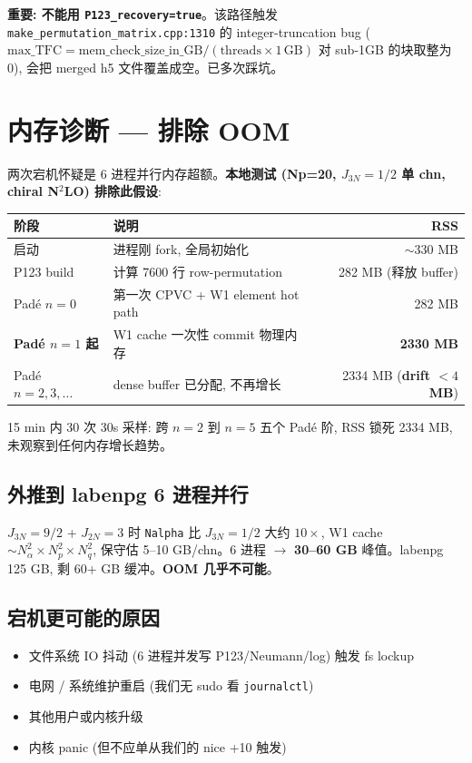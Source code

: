 \documentclass[11pt,a4paper]{article}
\begin{document}
\textbf{重要: 不能用 \texttt{P123\_recovery=true}}。该路径触发
\texttt{make\_permutation\_matrix.cpp:1310} 的 integer-truncation bug
($\mathrm{max\_TFC} = \mathrm{mem\_check\_size\_in\_GB} / (\mathrm{threads} \times 1\,\mathrm{GB})$
对 sub-1GB 的块取整为 0), 会把 merged h5 文件覆盖成空。已多次踩坑。

\section{内存诊断 — 排除 OOM}

两次宕机怀疑是 6 进程并行内存超额。\textbf{本地测试 (Np=20, $J_{3N}=1/2$ 单 chn,
chiral N$^2$LO) 排除此假设}:

\begin{tabularx}{\linewidth}{lXr}
\toprule
阶段 & 说明 & RSS \\
\midrule
启动 & 进程刚 fork, 全局初始化 & $\sim$330 MB \\
P123 build & 计算 7600 行 row-permutation & 282 MB (释放 buffer) \\
Padé $n=0$ & 第一次 CPVC + W1 element hot path & 282 MB \\
\textbf{Padé $n=1$ 起} & W1 cache 一次性 commit 物理内存 & \textbf{2330 MB} \\
Padé $n=2,3,\ldots$ & dense buffer 已分配, 不再增长 & 2334 MB (\textbf{drift $<4$ MB}) \\
\bottomrule
\end{tabularx}

15 min 内 30 次 30s 采样: 跨 $n=2$ 到 $n=5$ 五个 Padé 阶, RSS 锁死 2334 MB,
未观察到任何内存增长趋势。

\subsection{外推到 labenpg 6 进程并行}

$J_{3N}=9/2$ + $J_{2N}=3$ 时 \texttt{Nalpha} 比 $J_{3N}=1/2$ 大约
$10\times$, W1 cache $\sim N_\alpha^2 \times N_p^2 \times N_q^2$,
保守估 5--10 GB/chn。6 进程 $\to$ \textbf{30--60 GB} 峰值。labenpg 125 GB,
剩 60+ GB 缓冲。\textbf{OOM 几乎不可能}。

\subsection{宕机更可能的原因}

\begin{itemize}[itemsep=2pt]
\item 文件系统 IO 抖动 (6 进程并发写 P123/Neumann/log) 触发 fs lockup
\item 电网 / 系统维护重启 (我们无 sudo 看 \texttt{journalctl})
\item 其他用户或内核升级
\item 内核 panic (但不应单从我们的 nice +10 触发)
\end{itemize}
\end{document}
